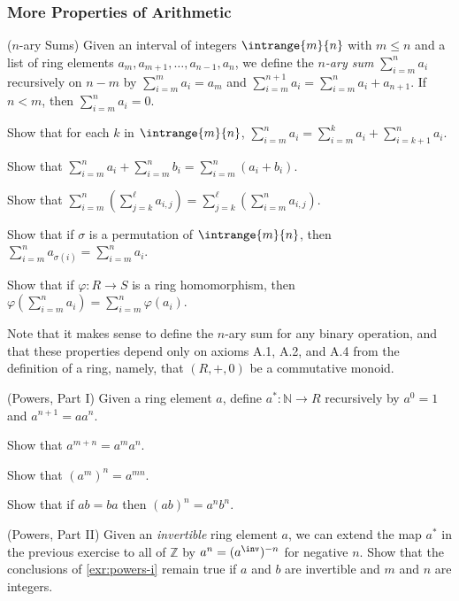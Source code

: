\subsubsection*{More Properties of Arithmetic}

\begin{exercises}
\ResumeExercises
\item{\label{exr:n-ary-sums}}
($n$-ary Sums) Given an interval of integers $\intrange{m}{n}$ with $m \leq n$ and a list of ring elements $a_m, a_{m+1}, \ldots, a_{n-1}, a_n$, we define the \emph{$n$-ary sum} $\sum_{i=m}^n a_i$ recursively on $n-m$ by $\sum_{i=m}^m a_i = a_m$ and $\sum_{i=m}^{n+1} a_i = \sum_{i=m}^{n} a_i + a_{n+1}$. If $n < m$, then $\sum_{i=m}^n a_i = 0$.
\begin{enumerate*}
\item Show that for each $k$ in $\intrange{m}{n}$, $\sum_{i=m}^n a_i = \sum_{i=m}^k a_i + \sum_{i=k+1}^n a_i$. \vspace{10pt}
\item Show that $\sum_{i=m}^n a_i + \sum_{i=m}^n b_i = \sum_{i=m}^n (a_i + b_i)$. \vspace{10pt}
\item Show that $\sum_{i=m}^n (\sum_{j=k}^\ell a_{i,j}) = \sum_{j=k}^\ell \left(\sum_{i=m}^n a_{i,j} \right)$. \vspace{10pt}
\item Show that if $\sigma$ is a permutation of $\intrange{m}{n}$, then $\sum_{i=m}^n a_{\sigma(i)} = \sum_{i=m}^n a_i$. \vspace{10pt}
\item Show that if $\varphi : R \rightarrow S$ is a ring homomorphism, then $\varphi(\sum_{i=m}^n a_i) = \sum_{i=m}^n \varphi(a_i)$.
\end{enumerate*}
Note that it makes sense to define the $n$-ary sum for any binary operation, and that these properties depend only on axioms A.1, A.2, and A.4 from the definition of a ring, namely, that $(R,+,0)$ be a commutative monoid.

\item{\label{exr:powers-i}}
(Powers, Part I) Given a ring element $a$, define $a^\ast : \mathbb{N} \rightarrow R$ recursively by $a^0 = 1$ and $a^{n+1} = aa^n$.
\begin{enumerate*}
\item Show that $a^{m+n} = a^ma^n$.
\item Show that $(a^m)^n = a^{mn}$.
\item Show that if $ab = ba$ then $(ab)^n = a^n b^n$.
\end{enumerate*}

\item{\label{exr:powers-ii}}
(Powers, Part II) Given an \emph{invertible} ring element $a$, we can extend the map $a^\ast$ in the previous exercise to all of $\mathbb{Z}$ by $a^n = (a^\inv)^{-n}$ for negative $n$. Show that the conclusions of \ref{exr:powers-i} remain true if $a$ and $b$ are invertible and $m$ and $n$ are integers.
\PauseExercises
\end{exercises}

